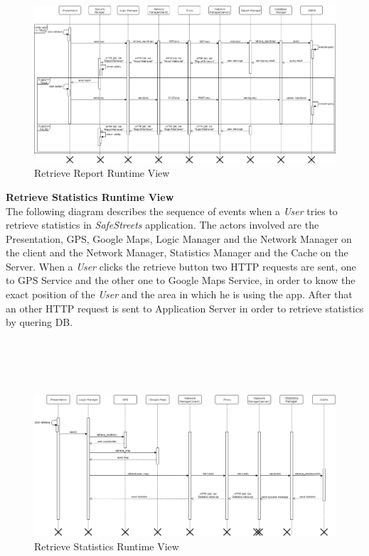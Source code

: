 \documentclass{article}
\begin{document}
\begin{figure}[H]
    \centering
    \includegraphics[scale=0.3]{img/sequence_diagrams/retrieve_report.png}
    \caption{Retrieve Report Runtime View}
\end{figure}  
\clearpage
\textbf{Retrieve Statistics Runtime View}\\
The following diagram describes the sequence of events when a \textit{User} tries to retrieve statistics in
\textit{SafeStreets} application. The actors involved are the Presentation, GPS, Google Maps, Logic Manager and 
the Network Manager on the client and the Network Manager, Statistics Manager and the Cache on the Server.
When a \textit{User} clicks the retrieve button two HTTP requests are sent, one to GPS Service and the other
one to Google Maps Service, in order to know the exact position of the \textit{User} and the area in which he is
using the app. After that an other HTTP request is sent to Application Server in order to retrieve statistics by 
quering DB. 
\\
\\
\\
\\
\\
\begin{figure}[H]
    \centering
    \includegraphics[scale=0.3]{img/sequence_diagrams/retrieve_statistics.png}
    \caption{Retrieve Statistics Runtime View}
\end{figure}  
\clearpage
\end{document}
